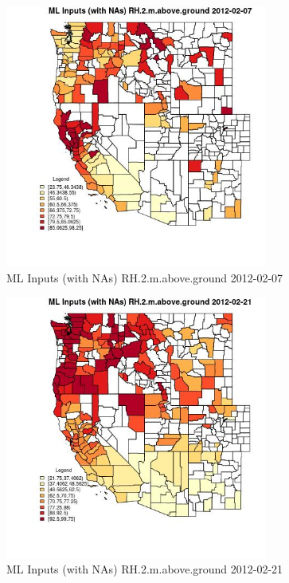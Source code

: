 \begin{figure} 
\centering  
\includegraphics[width=0.77\textwidth]{Code_Outputs/Report_ML_input_PM25_Step4_part_f_de_duplicated_aveswNAs_CountyRH2mabovegroundMean2012-02-07.jpg} 
\caption{\label{fig:Report_ML_input_PM25_Step4_part_f_de_duplicated_aveswNAsCountyRH2mabovegroundMean2012-02-07}ML Inputs (with NAs) RH.2.m.above.ground 2012-02-07} 
\end{figure} 
 

\begin{figure} 
\centering  
\includegraphics[width=0.77\textwidth]{Code_Outputs/Report_ML_input_PM25_Step4_part_f_de_duplicated_aveswNAs_CountyRH2mabovegroundMean2012-02-21.jpg} 
\caption{\label{fig:Report_ML_input_PM25_Step4_part_f_de_duplicated_aveswNAsCountyRH2mabovegroundMean2012-02-21}ML Inputs (with NAs) RH.2.m.above.ground 2012-02-21} 
\end{figure} 
 

